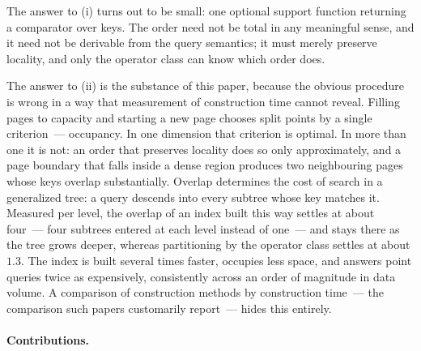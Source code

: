 The answer to (i) turns out to be small: one optional support function
returning a comparator over keys. The order need not be total in any meaningful
sense, and it need not be derivable from the query semantics; it must merely
preserve locality, and only the operator class can know which order does.

The answer to (ii) is the substance of this paper, because the obvious
procedure is wrong in a way that measurement of construction time cannot
reveal. Filling pages to capacity and starting a new page chooses split points
by a single criterion~--- occupancy. In one dimension that criterion is
optimal. In more than one it is not: an order that preserves locality does so
only approximately, and a page boundary that falls inside a dense region
produces two neighbouring pages whose keys overlap substantially. Overlap
determines the cost of search in a generalized tree: a query descends into
every subtree whose key matches it. Measured per level, the overlap of an index
built this way settles at about four~--- four subtrees entered at each level
instead of one~--- and stays there as the tree grows deeper, whereas
partitioning by the operator class settles at about $1.3$. The index is built
several times faster, occupies less space, and answers point queries twice as
expensively, consistently across an order of magnitude in data volume. A
comparison of construction methods by construction time~--- the comparison such
papers customarily report~--- hides this entirely.

\paragraph{Contributions.}

